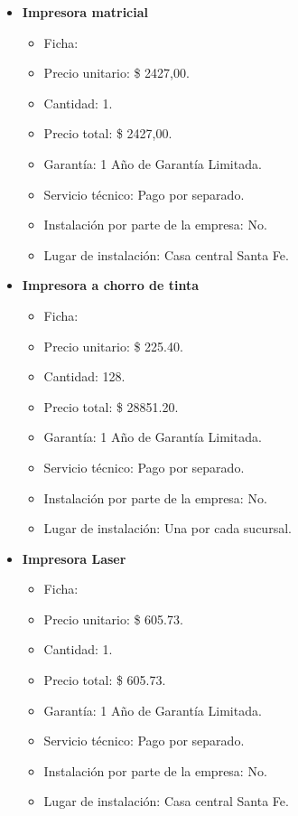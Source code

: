 \begin{itemize}
  \item \textbf{Impresora matricial}
    \begin{itemize}
      \item Ficha:
      \item Precio unitario: \$ 2427,00.
      \item Cantidad: 1.
      \item Precio total: \$ 2427,00.
      \item Garantía: 1 Año de Garantía Limitada.
      \item Servicio técnico: Pago por separado.
      \item Instalación por parte de la empresa: No.
      \item Lugar de instalación: Casa central Santa Fe.
    \end{itemize}
    
  \item \textbf{Impresora a chorro de tinta}
    \begin{itemize}
      \item Ficha:
      \item Precio unitario: \$ 225.40.
      \item Cantidad: 128.
      \item Precio total: \$ 28851.20.
      \item Garantía: 1 Año de Garantía Limitada.
      \item Servicio técnico: Pago por separado.
      \item Instalación por parte de la empresa: No.
      \item Lugar de instalación: Una por cada sucursal.
    \end{itemize}
    
  \item \textbf{Impresora Laser}
    \begin{itemize}
      \item Ficha:
      \item Precio unitario: \$ 605.73.
      \item Cantidad: 1.
      \item Precio total: \$ 605.73.
      \item Garantía: 1 Año de Garantía Limitada.
      \item Servicio técnico: Pago por separado.
      \item Instalación por parte de la empresa: No.
      \item Lugar de instalación: Casa central Santa Fe.
    \end{itemize}
\end{itemize}

